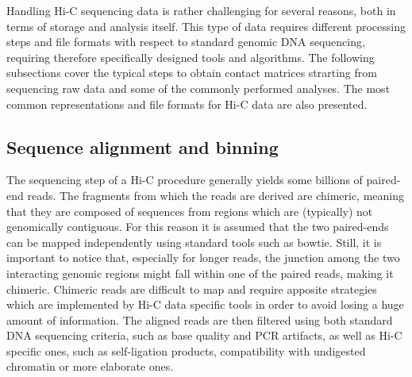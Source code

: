 Handling Hi-C sequencing data is rather challenging for several reasons, both in terms of storage and analysis itself. This type of data requires different processing steps and file formats with respect to standard genomic DNA sequencing, requiring therefore specifically designed tools and algorithms. The following subsections cover the typical steps to obtain contact matrices strarting from sequencing raw data and some of the commonly performed analyses\cite{hicprocessing2018}. The most common representations and file formats for Hi-C data are also presented.

\subsection{Sequence alignment and binning}
The sequencing step of a Hi-C procedure generally yields some billions of paired-end reads. The fragments from which the reads are derived are chimeric, meaning that they are composed of sequences from regions which are (typically) not genomically contiguous. For this reason it is assumed that the two paired-ends can be mapped independently using standard tools such as bowtie. Still, it is important to notice that, especially for longer reads, the junction among the two interacting genomic regions might fall within one of the paired reads, making it chimeric. Chimeric reads are difficult to map and require apposite strategies which are implemented by Hi-C data specific tools in order to avoid losing a huge amount of information. The aligned reads are then filtered using both standard DNA sequencing criteria, such as base quality and PCR artifacts, as well as Hi-C specific ones, such as self-ligation products, compatibility with undigested chromatin\cite{readfiltering2013} or more elaborate ones\cite{complexfiltering2017}.

